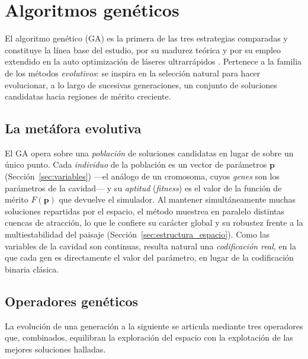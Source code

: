 
\section{Algoritmos genéticos}
\label{sec:ga}

El algoritmo genético (GA) es la primera de las tres estrategias comparadas y
constituye la línea base del estudio, por su madurez teórica y por su empleo
extendido en la auto optimización de láseres ultrarrápidos
\cite{Andral2015,Woodward2016}. Pertenece a la familia de los métodos
\emph{evolutivos}: se inspira en la selección natural para hacer evolucionar, a lo
largo de sucesivas generaciones, un conjunto de soluciones candidatas hacia
regiones de mérito creciente.

\subsection{La metáfora evolutiva}
\label{sec:ga_metafora}

El GA opera sobre una \emph{población} de soluciones candidatas en lugar de sobre un
único punto. Cada \emph{individuo} de la población es un vector de parámetros
$\mathbf{p}$ (Sección~\ref{sec:variables}) —el análogo de un cromosoma, cuyos
\emph{genes} son los parámetros de la cavidad— y su \emph{aptitud} (\emph{fitness})
es el valor de la función de mérito $F(\mathbf{p})$ que devuelve el simulador. Al
mantener simultáneamente muchas soluciones repartidas por el espacio, el método
muestrea en paralelo distintas cuencas de atracción, lo que le confiere su carácter
global y su robustez frente a la multiestabilidad del paisaje
(Sección~\ref{sec:estructura_espacio}). Como las variables de la cavidad son
continuas, resulta natural una \emph{codificación real}, en la que cada gen es
directamente el valor del parámetro, en lugar de la codificación binaria clásica.

\subsection{Operadores genéticos}
\label{sec:ga_operadores}

La evolución de una generación a la siguiente se articula mediante tres operadores
que, combinados, equilibran la exploración del espacio con la explotación de las
mejores soluciones halladas.

